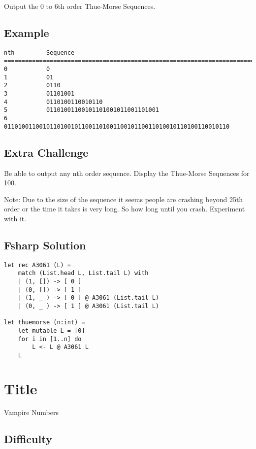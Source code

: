 Output the 0 to 6th order Thue-Morse Sequences.

\subsection{Example}\label{example}

\begin{verbatim}
nth         Sequence
===========================================================================
0           0
1           01
2           0110
3           01101001
4           0110100110010110
5           01101001100101101001011001101001
6           0110100110010110100101100110100110010110011010010110100110010110
\end{verbatim}

\subsection{Extra Challenge}\label{extra-challenge}

Be able to output any nth order sequence. Display the Thue-Morse
Sequences for 100.

Note: Due to the size of the sequence it seems people are crashing
beyond 25th order or the time it takes is very long. So how long until
you crash. Experiment with it.

\subsection{Fsharp Solution}\label{fsharp-solution}

\begin{verbatim}
let rec A3061 (L) =
    match (List.head L, List.tail L) with
    | (1, []) -> [ 0 ]
    | (0, []) -> [ 1 ]
    | (1, _ ) -> [ 0 ] @ A3061 (List.tail L)
    | (0, _ ) -> [ 1 ] @ A3061 (List.tail L)

let thuemorse (n:int) = 
    let mutable L = [0]
    for i in [1..n] do
        L <- L @ A3061 L
    L
\end{verbatim}

\section{Title}\label{title-11}

Vampire Numbers

\subsection{Difficulty}\label{difficulty-10}

